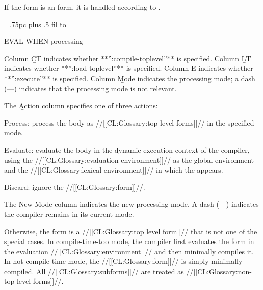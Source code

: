   If the form is an  form, it is
handled according to \thenextfigure.

\boxfig
{=.75pc
\tabskip {} plus .5 fil
\offinterlineskip
\halign to }
\caption{EVAL-WHEN processing}
\endfig

Column \b{CT}   indicates whether **'':compile-toplevel''** is specified.
Column \b{LT}   indicates whether **'':load-toplevel''** is specified.
Column \b{E}    indicates whether **'':execute''** is specified.  
Column \b{Mode} indicates the processing mode; 
		a dash (---) indicates that the processing mode is not relevant.
   
The \b{Action} column specifies one of three actions:

\beginlist

 \item{}\b{Process:} process the body as //[[CL:Glossary:top level forms]]// in the
specified mode.
 
 \item{}\b{Evaluate:} evaluate the body in the dynamic execution
context of the compiler, using the //[[CL:Glossary:evaluation environment]]// as
the global environment and the //[[CL:Glossary:lexical environment]]// in which
the  appears.
 
\item{}\b{Discard:} ignore the //[[CL:Glossary:form]]//.
\endlist

The \b{New Mode} column indicates the new processing mode. 
A dash (---) indicates the compiler remains in its current mode.

  Otherwise, the form is a //[[CL:Glossary:top level form]]// that
is not one of the special cases.  In compile-time-too mode, the
compiler first evaluates the form in the evaluation 
//[[CL:Glossary:environment]]// and then minimally compiles it.  In not-compile-time
mode, the //[[CL:Glossary:form]]// is simply minimally compiled.  All //[[CL:Glossary:subforms]]//
are treated as //[[CL:Glossary:non-top-level forms]]//.


